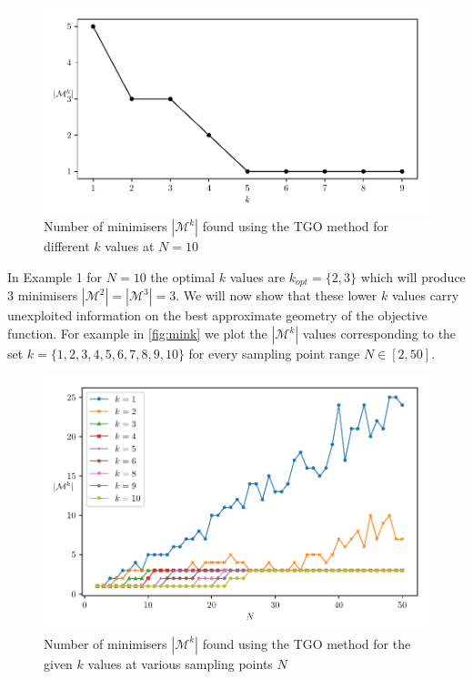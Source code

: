 \begin{figure}
\centerline{\includegraphics[scale=0.8]{./Fig2.pdf}}
{\caption{Number of minimisers $|\mathcal{M}^k|$ found using the TGO method for different $k$ values at $N = 10$}  \label{fig:min}}
\end{figure}

In Example 1 for $N = 10$ the optimal $k$ values are $k_{opt}=\{2, 3\}$ which will produce 3 minimisers $|\mathcal{M}^2| = |\mathcal{M}^3| = 3$. We will now show that these lower $k$ values carry unexploited information on the best approximate geometry of the objective function. For example in \autoref{fig:mink} we plot the $|\mathcal{M}^k|$ values corresponding to the set $k = \{1, 2, 3, 4, 5, 6, 7, 8, 9, 10\}$ for every sampling point range $N \in [2, 50]$.

\begin{figure} 
\centerline{\includegraphics[scale=0.8]{./Fig3.pdf}}
{\caption{Number of minimisers $|\mathcal{M}^k|$ found using the TGO method for the given $k$ values at various sampling points $N$} \label{fig:mink}}
\end{figure}

